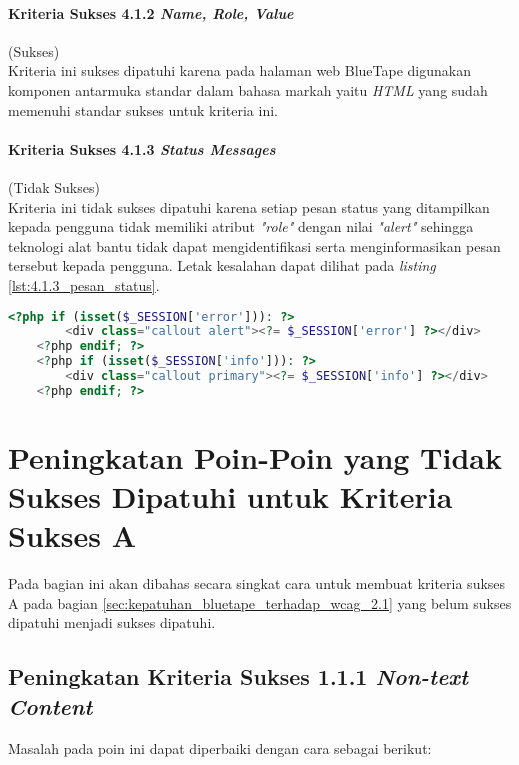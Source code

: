 \paragraph{Kriteria Sukses 4.1.2 \textit{Name, Role, Value}}
\label{par:kepatuhan_bluetape_kriteria_sukses_4.1.2}
(Sukses)\\

Kriteria ini sukses dipatuhi karena pada halaman web BlueTape digunakan komponen antarmuka standar dalam bahasa markah yaitu \textit{HTML} yang sudah memenuhi standar sukses untuk kriteria ini.

\paragraph{Kriteria Sukses 4.1.3 \textit{Status Messages}}
\label{par:kepatuhan_bluetape_kriteria_sukses_4.1.3}
(Tidak Sukses)\\

Kriteria ini tidak sukses dipatuhi karena setiap pesan status yang ditampilkan kepada pengguna tidak memiliki atribut \textit{"role"} dengan nilai \textit{"alert"} sehingga teknologi alat bantu tidak dapat mengidentifikasi serta menginformasikan pesan tersebut kepada pengguna. Letak kesalahan dapat dilihat pada \textit{listing} \ref{lst:4.1.3_pesan_status}.

\begin{lstlisting}[frame=single, label={lst:4.1.3_pesan_status}, language=PHP, caption=Pelanggaran Kriteria Sukses 4.1.3 pada Bagian Pesan Status]
    <?php if (isset($_SESSION['error'])): ?>
        <div class="callout alert"><?= $_SESSION['error'] ?></div>
    <?php endif; ?>
    <?php if (isset($_SESSION['info'])): ?>
        <div class="callout primary"><?= $_SESSION['info'] ?></div>
    <?php endif; ?>
\end{lstlisting}

\section{Peningkatan Poin-Poin yang Tidak Sukses Dipatuhi untuk Kriteria Sukses A}
\label{sec:peningkatan_kriteria_sukses_a}
Pada bagian ini akan dibahas secara singkat cara untuk membuat kriteria sukses A pada bagian \ref{sec:kepatuhan_bluetape_terhadap_wcag_2.1} yang belum sukses dipatuhi menjadi sukses dipatuhi.

\subsection{Peningkatan Kriteria Sukses 1.1.1 \textit{Non-text Content}}
\label{subsec:peningkatan_kriteria_sukses_1.1.1}
Masalah pada poin ini dapat diperbaiki dengan cara sebagai berikut: 


